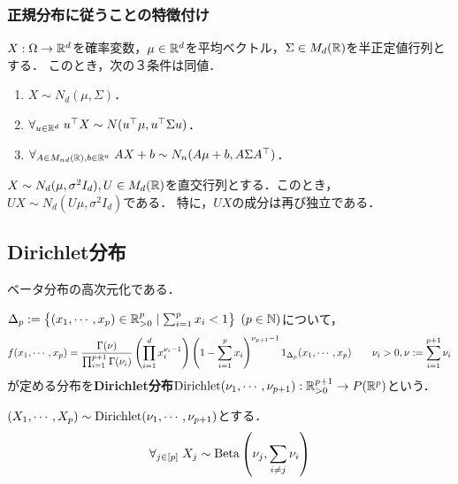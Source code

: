 \documentclass[uplatex,dvipdfmx]{jsreport}
\begin{document}
\subsubsection{正規分布に従うことの特徴付け}

\begin{proposition}
    $X:\Omega\to\mathbb{R}^d$を確率変数，$\mu\in\mathbb{R}^d$を平均ベクトル，$\Sigma\in M_d(\mathbb{R})$を半正定値行列とする．
    このとき，次の３条件は同値．
    \begin{enumerate}
        \item $X\sim N_d(\mu,\Sigma)$．
        \item $\forall_{u\in\mathbb{R}^d}\;u^\top X\sim N(u^\top\mu,u^\top\Sigma u)$．
        \item $\forall_{A\in M_{nd}(\mathbb{R}),b\in\mathbb{R}^n}\;AX+b\sim N_n(A\mu+b,A\Sigma A^\top)$．
    \end{enumerate}
\end{proposition}

\begin{corollary}[ユニタリ変換は成分の独立性を変えない]
    $X\sim N_d(\mu,\sigma^2I_d),U\in M_d(\mathbb{R})$を直交行列とする．このとき，$UX\sim N_d(U\mu,\sigma^2I_d)$である．
    特に，$UX$の成分は再び独立である．
\end{corollary}

\subsection{Dirichlet分布}

\begin{tcolorbox}[colframe=ForestGreen, colback=ForestGreen!10!white,breakable,colbacktitle=ForestGreen!40!white,coltitle=black,fonttitle=\bfseries\sffamily,
title=]
    ベータ分布の高次元化である．
\end{tcolorbox}

\begin{definition}
    $\Delta_p:=\left\{(x_1,\cdots,x_p)\in\mathbb{R}_{>0}^p\mid\sum^p_{i=1}x_i<1\right\}\;(p\in\mathbb{N})$について，
    \[f(x_1,\cdots,x_p)=\frac{\Gamma(\nu)}{\prod^{p+1}_{i=1}\Gamma(\nu_i)}\left(\prod^d_{i=1}x_i^{\nu_i-1}\right)\left(1-\sum^p_{i=1}x_i\right)^{\nu_{p+1}-1}1_{\Delta_p}(x_1,\cdots,x_p)\qquad\nu_i>0,\nu:=\sum^{p+1}_{i=1}\nu_i\]
    が定める分布を\textbf{Dirichlet分布}$\mathrm{Dirichlet}(\nu_1,\cdots,\nu_{p+1}):\mathbb{R}_{>0}^{p+1}\to P(\mathbb{R}^p)$という．
\end{definition}

\begin{lemma}
    $(X_1,\cdots,X_p)\sim\mathrm{Dirichlet}(\nu_1,\cdots,\nu_{p+1})$とする．
    \[\forall_{j\in[p]}\;X_j\sim\mathrm{Beta}\left(\nu_j,\sum_{i\ne j}\nu_i\right)\]
\end{lemma}
\end{document}
